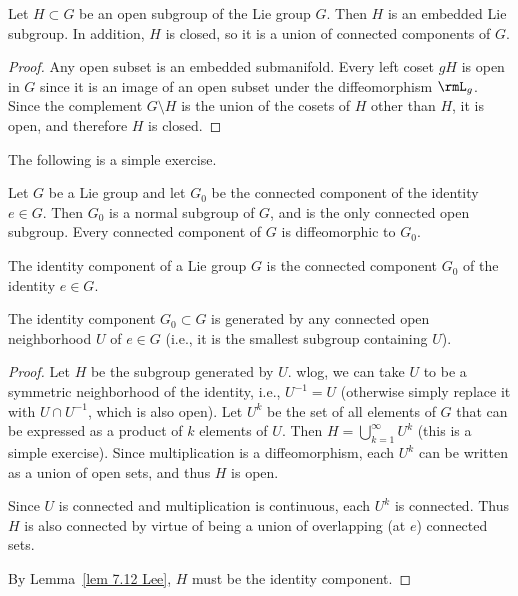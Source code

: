 \begin{lem}\label{lem 7.12 Lee}
    Let $H\subset G$ be an open subgroup of the Lie group $G$. Then $H$ is an embedded Lie subgroup. In addition, $H$ is closed, so it is a union of connected components of $G$.
\end{lem}
\begin{proof}
    Any open subset is an embedded submanifold. Every left coset $gH$ is open in $G$ since it is an image of an open subset under the diffeomorphism $\rmL_g$. Since the complement $G\setminus H$ is the union of the cosets of $H$ other than $H$, it is open, and therefore $H$ is closed.
\end{proof}

The following is a simple exercise.
\begin{prop}
    Let $G$ be a Lie group and let $G_0$ be the connected component of the identity $e\in G$. Then $G_0$ is a normal subgroup of $G$, and is the only connected open subgroup. Every connected component of $G$ is diffeomorphic to $G_0$.
\end{prop}

\begin{defn}
    The identity component of a Lie group $G$ is the connected component $G_0$ of the identity $e\in G$.
\end{defn}

\begin{prop}\label{prop 7.14 Lee}
    The identity component $G_0\subset G$ is generated by any connected open neighborhood $U$ of $e\in G$ (i.e., it is the smallest subgroup containing $U$).
\end{prop}
\begin{proof}
    Let $H$ be the subgroup generated by $U$. \gls{wlog}, we can take $U$ to be a symmetric neighborhood of the identity, i.e., $U^{-1}=U$ (otherwise simply replace it with $U\cap U^{-1}$, which is also open). Let $U^k$ be the set of all elements of $G$ that can be expressed as a product of $k$ elements of $U$. Then $H=\bigcup_{k=1}^\infty U^k$ (this is a simple exercise). Since multiplication is a diffeomorphism, each $U^k$ can be written as a union of open sets, and thus $H$ is open.

    Since $U$ is connected and multiplication is continuous, each $U^k$ is connected. Thus $H$ is also connected by virtue of being a union of overlapping (at $e$) connected sets.

    By Lemma~\ref{lem 7.12 Lee}, $H$ must be the identity component.
\end{proof}


